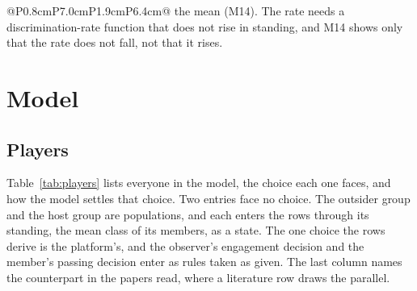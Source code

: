 \begin{longtable}{@{}P{0.8cm}P{7.0cm}P{1.9cm}P{6.4cm}@{}}
{  the mean (M14). The rate needs a discrimination-rate function that does not
  rise in standing, and M14 shows only that the rate does not fall, not that
  it rises.}
\end{longtable}
\normalsize

\section{Model}

\subsection{Players}

Table~\ref{tab:players} lists everyone in the model, the choice each one
faces, and how the model settles that choice. Two entries face no choice.
The outsider group and the host group are populations, and each enters the
rows through its standing, the mean class of its members, as a state. The
one choice the rows derive is the platform's, and the observer's engagement
decision and the member's passing decision enter as rules taken as given.
The last column names the counterpart in the papers read, where a
literature row draws the parallel.


